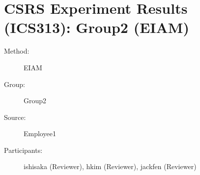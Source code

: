 
%          
	  
\chapter {CSRS Experiment Results (ICS313): Group2 (EIAM)}
\small

\begin{description}
\item [Method:] EIAM
\item [Group:] Group2
\item [Source:] Employee1
\item [Participants:] ishisaka (Reviewer), hkim (Reviewer), jackfen (Reviewer)
\end{description}
